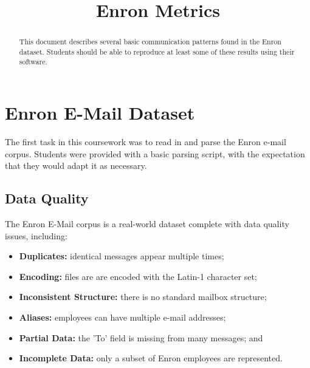 \documentclass[a4paper]{article}
\title{Enron Metrics}
\begin{document}
\maketitle
\begin{abstract}
  This document describes several basic communication patterns found in the Enron dataset.
  Students should be able to reproduce at least some of these results using their software.
\end{abstract}

\section{Enron E-Mail Dataset}
The first task in this coursework was to read in and parse the Enron e-mail corpus. 
Students were provided with a basic parsing script, with the expectation that they would adapt it as necessary.

\subsection{Data Quality}
The Enron E-Mail corpus is a real-world dataset complete with data quality issues, including:
\begin{itemize}
  \item \textbf{Duplicates:} identical messages appear multiple times;
  \item \textbf{Encoding:} files are are encoded with the Latin-1 character set;
  \item \textbf{Inconsistent Structure:} there is no standard mailbox structure;
  \item \textbf{Aliases:} employees can have multiple e-mail addresses;
  \item \textbf{Partial Data:} the 'To' field is missing from many messages; and 
  \item \textbf{Incomplete Data:} only a subset of Enron employees are represented.
\end{itemize}
\end{document}
